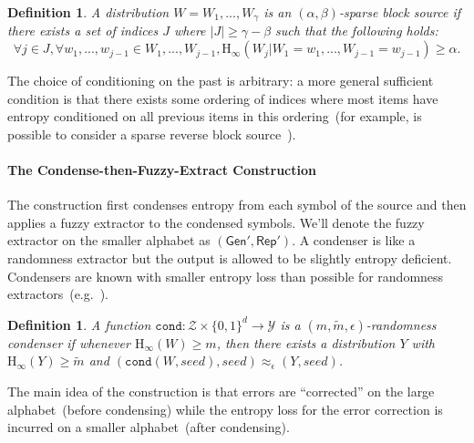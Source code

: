 \documentclass[11pt]{article}
\newtheorem{definition}[theorem]{Definition}
\newcommand{\class}[1]{{\ensuremath{\mathsf{#1}}}}
\newcommand{\gen}{\ensuremath{\class{Gen}}\xspace}
\newcommand{\rep}{\ensuremath{\class{Rep}}\xspace}
\newcommand{\zo}{\ensuremath{\{0, 1\}}}
\newcommand{\Hoo}{\mathrm{H}_\infty}
\newcommand{\cond}{\ensuremath{\mathtt{cond}}}
\begin{document}
\begin{definition}
\label{def:partial source}
A distribution $W = W_1,..., W_\gamma$ is an $(\alpha, \beta)$-sparse block source if there exists a set of indices $J$ where $|J| \geq \gamma - \beta$ such that the following holds:
\[
\forall j\in J, \forall w_1,..., w_{j-1} \in W_1,..., W_{j-1}, \Hoo(W_j | W_1 = w_1,..., W_{j-1}=w_{j-1}) \geq \alpha.
\]
\end{definition}
The choice of conditioning on the past is arbitrary: a more general sufficient condition is that there exists some ordering of indices where most items have entropy conditioned on all previous items in this ordering~(for example, is possible to consider a sparse reverse block source~\cite{vadhan2003constructing}).  

\paragraph{The Condense-then-Fuzzy-Extract Construction}
The construction first condenses entropy from each symbol of the source and then applies a fuzzy extractor to the condensed symbols. We'll denote the fuzzy extractor on the smaller alphabet as $(\gen', \rep')$.  A condenser is like a randomness extractor but the output is allowed to be slightly entropy deficient.  Condensers are known with smaller entropy loss than possible for randomness extractors~(e.g.~\cite{dodis2014key}).
\begin{definition}
\label{def:conductor}
A function $\cond : \mathcal{Z}\times \zo^d\rightarrow \mathcal{Y}$ is a $(m, \tilde{m}, \epsilon)$-randomness condenser if whenever $\Hoo(W)\ge m$, then there exists a distribution $Y$ with $\Hoo(Y)\ge \tilde{m}$ and $(\cond(W, seed), seed) \approx_\epsilon (Y, seed)$.
\end{definition}

The main idea of the construction is that errors are ``corrected'' on the large alphabet~(before condensing) while the entropy loss for the error correction is incurred on a smaller alphabet~(after condensing).
\end{document}
